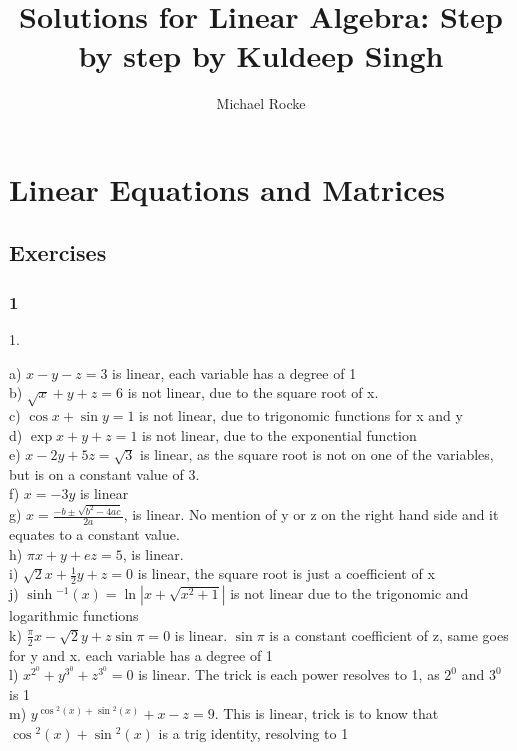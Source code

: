 \documentclass[]{report}
\title{Solutions for Linear Algebra: Step by step by Kuldeep Singh}
\author{Michael Rocke}
\begin{document}
\maketitle

\tableofcontents

\chapter{Linear Equations and Matrices}
\section {Exercises}

\subsection{1}

1.

a) $x - y -z = 3$ is linear, each variable has a degree of 1
\\
b) $\sqrt{x} + y + z = 6$ is not linear, due to the square root of x. 
\\
c) $\cos{x} + \sin{y} = 1$ is not linear, due to trigonomic functions for x and y
\\
d) $\exp{x + y + z} = 1$  is not linear, due to the exponential function
\\
e) $x - 2y + 5z = \sqrt{3}$ is linear, as the square root is not on one of the variables, but is on a constant value of 3. 
\\
f) $x = -3y$ is linear
\\
g) $x = \frac{-b \pm \sqrt{b^2 - 4ac}}{2a}$, is linear. No mention of y or z on the right hand side and it equates to a constant value.
\\
h) $\pi{}x + y + ez = 5$, is linear. 
\\
i) $\sqrt{2}x + \frac{1}{2}y + z = 0$ is linear, the square root is just a coefficient of x
\\
j) $\sinh{^{-1}}({x}) = \ln|x + \sqrt{x^2 + 1}| $ is not linear due to the trigonomic and logarithmic functions
\\
k) $\frac{\pi}{2}x - \sqrt{2}y + z\sin{\pi} = 0$ is linear. $\sin{\pi}$ is a constant coefficient of z, same goes for y and x. each variable has a degree of 1
\\
l) $x^{2^0} + y^{3^0} + z^{3^0} = 0$ is linear. The trick is each power resolves to 1, as $2^0$ and $3^0$ is 1
\\
m) $y^{\cos{^2}(x) + \sin{^2}(x)} + x - z = 9$. This is linear, trick is to know that ${\cos{^2}(x) + \sin{^2}(x)} $ is a trig identity, resolving to 1
\\
\end{document}
